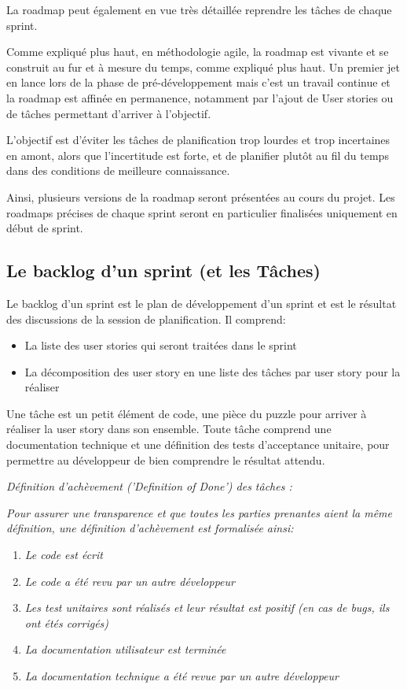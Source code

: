 La roadmap peut également en vue très détaillée reprendre les tâches de chaque sprint.

Comme expliqué plus haut, en méthodologie agile, la roadmap est vivante et se construit au fur et à mesure 
du temps, comme expliqué plus haut. Un premier jet en lance lors de la phase de pré-développement 
mais c’est un travail continue et la roadmap est affinée en permanence, notamment par l’ajout de User stories 
ou de tâches permettant d’arriver à l'objectif.

L’objectif est d'éviter les tâches de planification trop lourdes et trop incertaines en amont, 
alors que l’incertitude est forte, et de planifier plutôt au fil du temps dans des conditions de 
meilleure connaissance.

Ainsi, plusieurs versions de la roadmap seront présentées au cours du projet. Les roadmaps précises 
de chaque sprint seront en particulier finalisées uniquement en début de sprint.



\subsection{Le backlog d’un sprint (et les Tâches)}

Le backlog d’un sprint est le plan de développement d’un sprint et est le résultat des discussions 
de la session de planification. Il comprend:
\begin{itemize}
      \item La liste des user stories qui seront traitées dans le sprint
      \item La décomposition des user story en une liste des tâches par user story pour la réaliser
\end{itemize}

Une tâche est un petit élément de code, une pièce du puzzle pour arriver à réaliser la user story 
dans son ensemble.
Toute tâche comprend une documentation technique et une définition des tests d’acceptance unitaire, 
pour permettre au développeur de bien comprendre le résultat attendu. 

\noindent%
\hfill%
\begin{minipage}{12cm}
      \textsl{Définition d'achèvement ('Definition of Done') des tâches :}

      \textsl{Pour assurer une transparence et que toutes les parties prenantes aient la même définition, 
une définition d'achèvement est formalisée ainsi:}
\begin{enumerate}     
      \item \textsl{Le code est écrit}
      \item \textsl{Le code a été revu par un autre développeur}
      \item \textsl{Les test unitaires sont réalisés et leur résultat est positif (en cas de bugs, 
      ils ont étés corrigés)}
      \item \textsl{La documentation utilisateur est terminée}
      \item \textsl{La documentation technique a été revue par un autre développeur}
\end{enumerate}
\end{minipage}

